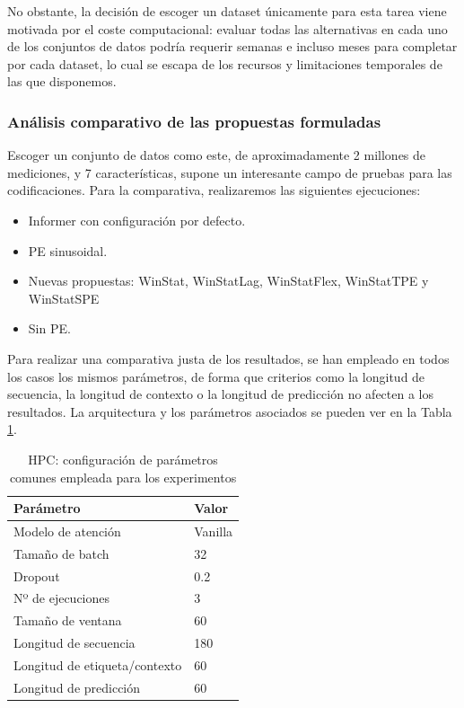 No obstante, la decisión de escoger un dataset únicamente para esta tarea viene motivada por el coste computacional: evaluar todas las alternativas en cada uno de los conjuntos de datos podría requerir semanas e incluso meses para completar por cada dataset, lo cual se escapa de los recursos y limitaciones temporales de las que disponemos.

\subsubsection{Análisis comparativo de las propuestas formuladas}

Escoger un conjunto de datos como este, de aproximadamente 2 millones de mediciones, y 7 características, supone un interesante campo de pruebas para las codificaciones. Para la comparativa, realizaremos las siguientes ejecuciones:

\begin{itemize}
	\item Informer con configuración por defecto.
	\item PE sinusoidal.
	\item Nuevas propuestas: WinStat, WinStatLag, WinStatFlex,  WinStatTPE y WinStatSPE	
	\item Sin PE.
\end{itemize}

Para realizar una comparativa justa de los resultados, se han empleado en todos los casos los mismos parámetros, de forma que criterios como la longitud de secuencia, la longitud de contexto o la longitud de predicción no afecten a los resultados. La arquitectura y los parámetros asociados se pueden ver en la Tabla \ref{ajustes}.

\begin{table}[!ht]
	\centering
	\begin{tabular}{l|l}
		\toprule
		Parámetro & Valor \\
		\midrule
		{Modelo de atención} & Vanilla \\
		{Tamaño de batch} & 32 \\
		{Dropout} & 0.2 \\
		{Nº de ejecuciones} & 3 \\
		{Tamaño de ventana} & 60 \\
		{Longitud de secuencia} & 180 \\
		{Longitud de etiqueta/contexto} & 60 \\
		{Longitud de predicción} & 60 \\
		\bottomrule
	\end{tabular}
	\caption{HPC: configuración de parámetros comunes empleada para los experimentos}
	\label{ajustes}
\end{table}

